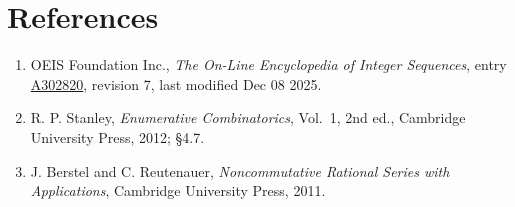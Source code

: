 \documentclass[11pt]{article}
\theoremstyle{definition}
\begin{document}
\section{References}

\begin{enumerate}

\item OEIS Foundation Inc., \emph{The On-Line Encyclopedia of Integer Sequences}, entry \href{https://oeis.org/A302820}{A302820}, revision 7, last modified Dec 08 2025.

\item R. P. Stanley, \emph{Enumerative Combinatorics}, Vol.~1, 2nd ed., Cambridge University Press, 2012; \S4.7.

\item J. Berstel and C. Reutenauer, \emph{Noncommutative Rational Series with Applications}, Cambridge University Press, 2011.

\end{enumerate}
\end{document}
